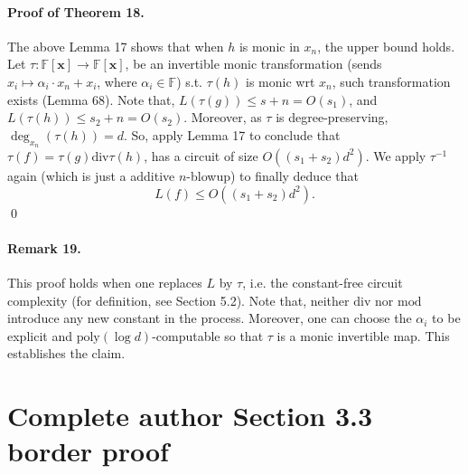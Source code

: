 \documentclass[10pt,a4paper]{article}
\begin{document}
\paragraph{Proof of Theorem 18.} The above Lemma 17 shows that when $h$ is monic in $x_n$, the upper bound holds. Let $\tau:\mathbb F[\mathbf x]\longrightarrow\mathbb F[\mathbf x]$, be an invertible monic transformation (sends $x_i\mapsto\alpha_i\cdot x_n+x_i$, where $\alpha_i\in\mathbb F$) s.t. $\tau(h)$ is monic wrt $x_n$, such transformation exists (Lemma 68). Note that, $L(\tau(g))\le s+n=O(s_1)$, and $L(\tau(h))\le s_2+n=O(s_2)$. Moreover, as $\tau$ is degree-preserving, $\deg_{x_n}(\tau(h))=d$.
So, apply Lemma 17 to conclude that $\tau(f)=\tau(g)\mathbin{\mathrm{div}}\tau(h)$, has a circuit of size $O((s_1+s_2)d^2)$. We apply $\tau^{-1}$ again (which is just a additive $n$-blowup) to finally deduce that
\[L(f)\le O((s_1+s_2)d^2).\]\qed
\paragraph{Remark 19.} This proof holds when one replaces $L$ by $\tau$, i.e. the constant-free circuit complexity (for definition, see Section 5.2). Note that, neither $\mathrm{div}$ nor $\mathrm{mod}$ introduce any new constant in the process. Moreover, one can choose the $\alpha_i$ to be explicit and $\mathrm{poly}(\log d)$-computable so that $\tau$ is a monic invertible map. This establishes the claim.
\section*{Complete author Section 3.3 border proof}
\end{document}

